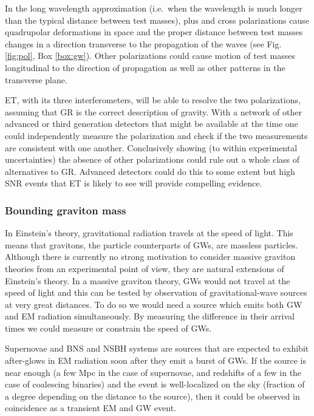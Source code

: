 In the long
wavelength approximation (i.e.\ when the wavelength is
much longer than the typical distance between test masses),
plus and cross polarizations cause quadrupolar deformations
in space and the proper distance between test masses changes
in a direction transverse to the propagation of the waves 
(see Fig.\,\ref{fig:pol}, Box \ref{box:gw}).  Other 
polarizations could cause motion of test masses longitudinal
to the direction of propagation as well as other patterns 
in the transverse plane. 

ET, with its three interferometers, will be able to resolve
the two polarizations, assuming that GR is the correct description
of gravity. With a network of other advanced or third generation
detectors that might be available at the time one could independently 
measure the polarization and check if the two measurements are
consistent with one another. Conclusively showing (to within 
experimental uncertainties) the absence of other polarizations 
could rule out a whole class of alternatives to GR. Advanced
detectors could do this to some extent but high SNR events that
ET is likely to see will provide compelling evidence.


\subsubsection{Bounding graviton mass}
In Einstein's theory, gravitational radiation travels at
the speed of light.  This means that gravitons, the particle
counterparts of GWs, are massless particles.
Although there is currently no strong motivation to
consider massive graviton theories from an experimental
point of view, they are natural extensions of Einstein's
theory.  In a massive graviton theory, GWs
would not travel at the speed of light and this can be
tested by observation of gravitational-wave sources
at very great distances.  To do so we would need a
source which emits both GW and EM radiation simultaneously.
By measuring the difference in their arrival times we could 
measure or constrain the speed of GWs.

Supernovae and BNS and NSBH systems are sources that are expected to 
exhibit after-glows in EM radiation soon after they emit a burst of GWs. 
If the source is near enough (a few Mpc in the case of supernovae, and
redshifts of a few in the case of coalescing binaries) and the
event is well-localized on the sky (fraction of a
degree depending on the distance to the source),
then it could be observed in coincidence as a transient
EM and GW event.

